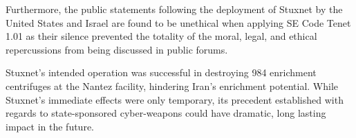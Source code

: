 \documentclass[12pt]{article}
\begin{document}
\begin{multicols}{2}
Furthermore, the public statements following the deployment of Stuxnet by the United States and Israel are found to be unethical when applying SE Code Tenet 1.01 as their silence prevented the totality of the moral, legal, and ethical repercussions from being discussed in public forums.

Stuxnet's intended operation was successful in destroying 984 enrichment centrifuges at the Nantez facility, hindering Iran's enrichment potential. While Stuxnet's immediate effects were only temporary,  its precedent established with regards to state-sponsored cyber-weapons could have dramatic, long lasting impact in the future.

\end{multicols}




\newpage

\end{document}

